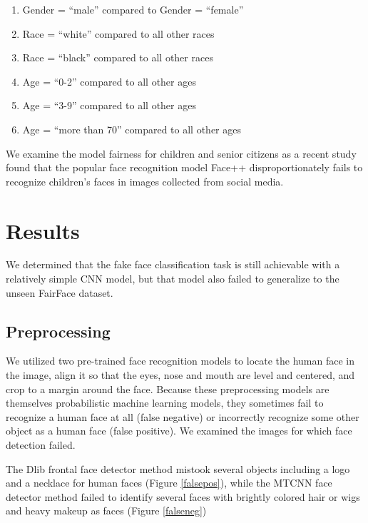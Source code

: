\documentclass[11pt, letterpaper]{article}
\providecommand{\tightlist}{%
  \setlength{\itemsep}{0pt}\setlength{\parskip}{0pt}
}
\begin{document}
\begin{multicols}{2}
  \begin{enumerate}
    \tightlist
  \item Gender = ``male'' compared to Gender = ``female''
  \item Race = ``white'' compared to all other races
  \item Race = ``black'' compared to all other races
  \item Age = ``0-2'' compared to all other ages
  \item Age = ``3-9'' compared to all other ages
  \item Age = ``more than 70'' compared to all other ages
  \end{enumerate}

  We examine the model fairness for children and senior citizens as a recent
  study \cite{9156262} found that the popular face recognition model Face++
  disproportionately fails to recognize children's faces in images collected
  from social media.

  \section{Results}

  We determined that the fake face classification task is
  still achievable with a relatively simple CNN model, but that model also
  failed to generalize to the unseen FairFace dataset.

  \subsection{Preprocessing}

  We utilized two pre-trained face recognition models to locate the human face
  in the image, align it so that the eyes, nose and mouth are level and
  centered, and crop to a margin around the face. Because these preprocessing
  models are themselves probabilistic machine learning models, they sometimes
  fail to recognize a human face at all (false negative) or incorrectly
  recognize some other object as a human face (false positive). We examined the
  images for which face detection failed.

  The Dlib frontal face detector method mistook several objects including a logo
  and a necklace for human faces (Figure \ref{falsepos}), while the MTCNN face
  detector method failed to identify several faces with brightly colored hair or
  wigs and heavy makeup as faces (Figure \ref{falseneg})


\end{multicols}
\end{document}

